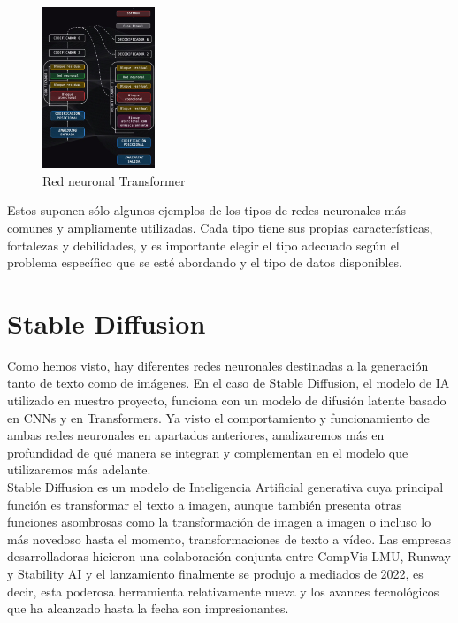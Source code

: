 \begin{figure}[h]
	\centering
	\includegraphics[width = 0.3\textwidth]{Imagenes/Vectorial/transformer.png}
	\caption{Red neuronal Transformer}
	\label{fig:transformer}
\end{figure}

Estos suponen sólo algunos ejemplos de los tipos de redes neuronales más comunes y ampliamente utilizadas. Cada tipo tiene sus propias características, fortalezas y debilidades, y es importante elegir el tipo adecuado según el problema específico que se esté abordando y el tipo de datos disponibles.\\

 \section{Stable Diffusion}

Como hemos visto, hay diferentes redes neuronales destinadas a la generación tanto de texto como de imágenes. En el caso de Stable Diffusion, el modelo de IA utilizado en nuestro proyecto, funciona con un modelo de difusión latente basado en CNNs y en Transformers. Ya visto el comportamiento y funcionamiento de ambas redes neuronales en apartados anteriores, analizaremos más en profundidad de qué manera se integran y complementan en el modelo que utilizaremos más adelante.\\


Stable Diffusion es un modelo de Inteligencia Artificial generativa cuya principal función es transformar el texto a imagen, aunque también presenta otras funciones asombrosas como la transformación de imagen a imagen o incluso lo más novedoso hasta el momento, transformaciones de texto a vídeo. Las empresas desarrolladoras hicieron una colaboración conjunta entre CompVis LMU, Runway y Stability AI y el lanzamiento finalmente se produjo a mediados de 2022, es decir, esta poderosa herramienta relativamente nueva y los avances tecnológicos que ha alcanzado hasta la fecha son impresionantes. \\


